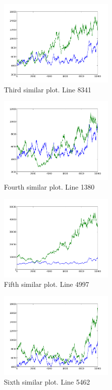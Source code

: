 \begin{figure}[h!]
    \centering
    \includegraphics[width=0.5\textwidth]{images/8341.png}
    \caption{Third similar plot.  Line 8341}
    \label{fig:ex1_3}
\end{figure}

\begin{figure}[h!]
    \centering
    \includegraphics[width=0.5\textwidth]{images/1380.png}
    \caption{Fourth similar plot.  Line 1380}
    \label{fig:ex1_4}
\end{figure}

\begin{figure}[h!]
    \centering
    \includegraphics[width=0.5\textwidth]{images/4997.png}
    \caption{Fifth similar plot.  Line 4997}
    \label{fig:ex1_5}
\end{figure}

\begin{figure}[h!]
    \centering
    \includegraphics[width=0.5\textwidth]{images/5462.png}
    \caption{Sixth similar plot.  Line 5462}
    \label{fig:ex1_6}
\end{figure}

